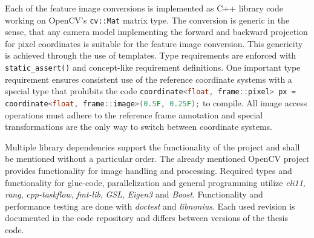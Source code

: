 Each of the feature image conversions is implemented as C++ library code working on OpenCV's\cite{opencv_library} \lstinline[basicstyle=\ttfamily]|cv::Mat| matrix type.
The conversion is generic in the sense, that any camera model implementing the forward and backward projection for pixel coordinates is suitable for the feature image conversion.
This genericity is achieved through the use of templates.
Type requirements are enforced with \lstinline[basicstyle=\ttfamily]|static_assert()| and concept-like\cite{c++concepts} requirement definitions.
One important type requirement ensures consistent use of the reference coordinate systems with a special type that prohibits the code \texttt{\lstinline[language=C++,basicstyle=\footnotesize\tt]|coordinate<float, frame::pixel> px = coordinate<float, frame::image>(0.5F, 0.25F);|} to compile.
All image access operations must adhere to the reference frame annotation and special transformations are the only way to switch between coordinate systems.

Multiple library dependencies support the functionality of the project and shall be mentioned without a particular order.
The already mentioned OpenCV\cite{opencv_library} project provides functionality for image handling and processing. 
Required types and functionality for glue-code, parallelization and general programming utilize \emph{cli11}\cite{cli11}, \emph{rang}\cite{rang}, \emph{cpp-taskflow}\cite{Huang2019CppTaskflowFT}, \emph{fmt-lib}\cite{fmtlib}, \emph{GSL}\cite{gsl}, \emph{Eigen3}\cite{eigenweb} and \emph{Boost}\cite{boost}.
Functionality and performance testing are done with \emph{doctest}\cite{doctest} and \emph{libnonius}\cite{libnonius}.
Each used revision is documented in the code repository and differs between versions of the thesis code.

